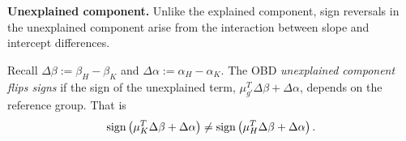 

\textbf{Unexplained component.}
Unlike the explained component, sign reversals in the unexplained component arise from the interaction between slope and intercept differences.
\begin{definition}
    \label{def:unexplained_sign_flip}
	Recall $\Delta\beta := \beta_H - \beta_K$ and $\Delta\alpha := \alpha_H - \alpha_K$. The OBD \emph{unexplained component flips signs} if the sign of the unexplained term, $\mu_{g'}^T \Delta\beta + \Delta\alpha$, depends on the reference group. That is
	\begin{equation}
		\operatorname{sign}\left( \mu_K^T \Delta\beta + \Delta\alpha \right) \neq \operatorname{sign}\left( \mu_H^T \Delta\beta + \Delta\alpha \right).
	\end{equation}
\end{definition}

